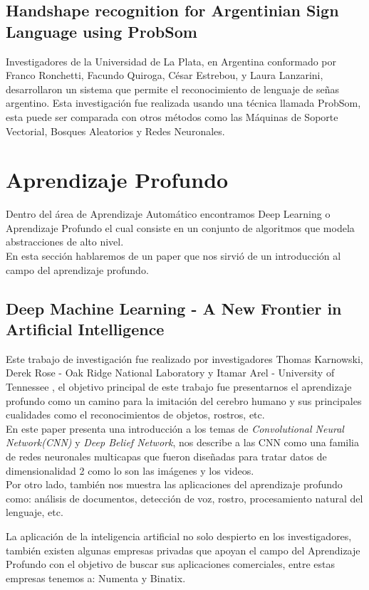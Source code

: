 \subsection{Handshape recognition for Argentinian Sign	Language using ProbSom}
Investigadores de la Universidad de La Plata, en Argentina  conformado por Franco Ronchetti, Facundo Quiroga, César Estrebou, y Laura Lanzarini\cite{HAND}, desarrollaron un sistema que permite el reconocimiento de lenguaje de señas argentino. Esta investigación fue realizada usando una técnica llamada ProbSom, esta puede ser comparada con otros métodos como las Máquinas de Soporte Vectorial, Bosques Aleatorios y Redes Neuronales.
\section{Aprendizaje Profundo}
Dentro del área de Aprendizaje Automático encontramos Deep Learning o Aprendizaje Profundo el cual consiste en un conjunto de algoritmos que modela abstracciones de alto nivel.\\
En esta sección hablaremos de un paper que nos sirvió de un introducción al campo del aprendizaje profundo.

\subsection{Deep Machine Learning - A New Frontier in Artificial Intelligence}
Este trabajo de investigación fue realizado por investigadores Thomas	Karnowski, Derek Rose - Oak Ridge National Laboratory y Itamar	Arel - University of Tennessee \cite{DML}, el objetivo principal de este trabajo fue presentarnos el aprendizaje profundo como un camino para la imitación del cerebro humano y sus principales cualidades como el reconocimientos de objetos, rostros, etc.\\
En este paper presenta una introducción a los temas de \textit{Convolutional Neural Network(CNN)} y \textit{Deep Belief Network}, nos describe a las CNN como una familia de redes neuronales multicapas que fueron diseñadas para tratar datos de dimensionalidad 2 como lo son las imágenes y los videos.\\
Por otro lado, también nos muestra las aplicaciones del aprendizaje profundo como: análisis de documentos, detección de voz, rostro, procesamiento natural del lenguaje, etc.

La aplicación de la inteligencia artificial no solo despierto en los investigadores, también existen algunas empresas privadas que apoyan el campo del Aprendizaje Profundo con el objetivo de buscar sus aplicaciones comerciales, entre estas empresas tenemos a: Numenta y Binatix.

